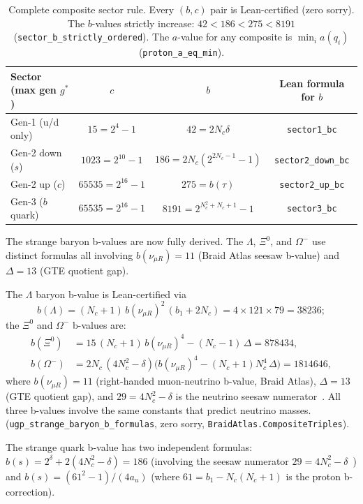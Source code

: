 \documentclass[12pt,a4paper]{article}
\begin{document}
\begin{table}[H]
\centering
\small
\begin{tabular}{lccc}
\toprule
Sector (max gen $g^*$) & $c$ & $b$ & Lean formula for $b$ \\
\midrule
Gen-1 (u/d only) & $15 = 2^4-1$ & $42 = 2N_c\delta$ & \texttt{sector1\_bc} \\
Gen-2 down ($s$) & $1023 = 2^{10}-1$ & $186 = 2N_c(2^{2N_c-1}-1)$ & \texttt{sector2\_down\_bc} \\
Gen-2 up ($c$) & $65535 = 2^{16}-1$ & $275 = b(\tau)$ & \texttt{sector2\_up\_bc} \\
Gen-3 ($b$ quark) & $65535 = 2^{16}-1$ & $8191 = 2^{N_c^2+N_c+1}-1$ & \texttt{sector3\_bc} \\
\bottomrule
\end{tabular}
\caption{Complete composite sector rule. Every $(b,c)$ pair is Lean-certified (zero sorry).
The $b$-values strictly increase: $42 < 186 < 275 < 8191$
(\texttt{sector\_b\_strictly\_ordered}).
The $a$-value for any composite is $\min_i a(q_i)$ (\texttt{proton\_a\_eq\_min}).}
\end{table}

The strange baryon b-values are now fully derived.
The $\Lambda$, $\Xi^0$, and $\Omega^-$ use distinct formulas all involving
$b(\nu_{\mu R}) = 11$ (Braid Atlas seesaw b-value) and $\Delta = 13$ (GTE quotient gap).

The $\Lambda$ baryon b-value is Lean-certified via
\begin{equation}
  b(\Lambda) = (N_c+1)\,b(\nu_{\mu R})^2\,(b_1+2N_c) = 4\times 121\times 79 = 38236;
\end{equation}
the $\Xi^0$ and $\Omega^-$ b-values are:
\begin{align}
  b(\Xi^0) &= 15\,(N_c+1)\,b(\nu_{\mu R})^4 - (N_c-1)\,\Delta = 878434, \\
  b(\Omega^-) &= 2N_c\,(4N_c^2{-}\delta)\bigl(b(\nu_{\mu R})^4 - (N_c+1)N_c^4\,\Delta\bigr) = 1814646,
\end{align}
where $b(\nu_{\mu R}) = 11$ (right-handed muon-neutrino b-value, Braid Atlas),
$\Delta = 13$ (GTE quotient gap), and $29 = 4N_c^2-\delta$ is the neutrino
seesaw numerator~\cite{SpivackNeutrino}.
All three b-values involve the same constants that predict neutrino masses.
(\texttt{ugp\_strange\_baryon\_b\_formulas}, zero sorry, \texttt{BraidAtlas.CompositeTriples}).

The strange quark b-value has two independent formulas:
$b(s) = 2^\delta + 2(4N_c^2 - \delta) = 186$ (involving the seesaw
numerator $29 = 4N_c^2-\delta$~\cite{SpivackNeutrino}) and
$b(s) = (61^2-1)/(4a_u)$ (where $61 = b_1 - N_c(N_c+1)$ is the proton
b-correction).
\end{document}
